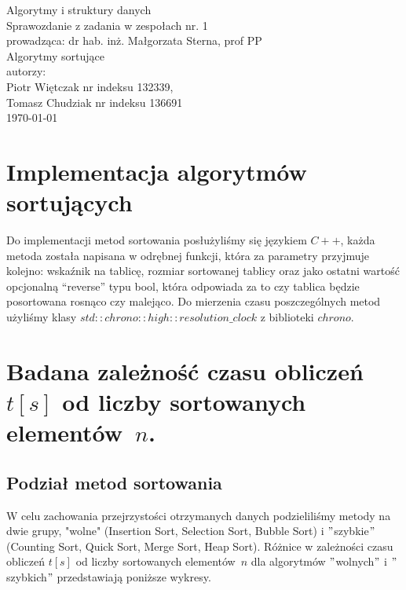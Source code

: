 \documentclass[polish,polish,a4paper]{article}
\begin{document}
	
\begin{spacing}{1.5}
		\begin{titlepage}
		\vspace*{\fill}
		\begin{center}
			{\Large Algorytmy i struktury danych \\[0.1cm]
				Sprawozdanie z zadania w zespołach nr. 1\\[0.1cm]
				prowadząca: dr hab. inż. Małgorzata Sterna, prof PP}\\[0.7cm]
			{\huge Algorytmy sortujące\\ [0.7cm]}
			{\large autorzy:\\[0.1cm]}
			{\Large Piotr Więtczak nr indeksu 132339,\\[0.1cm] Tomasz Chudziak nr indeksu 136691}\\[0.5cm]
			\today
		\end{center}
		\vspace*{\fill}
	\end{titlepage}
	
	\section{Implementacja algorytmów sortujących}
	Do implementacji metod sortowania posłużyliśmy się językiem $ C++ $, każda metoda została napisana  w odrębnej  funkcji, która za parametry przyjmuje kolejno: wskaźnik na tablicę, rozmiar sortowanej tablicy oraz jako ostatni wartość opcjonalną “reverse” typu bool, która odpowiada za to czy tablica będzie posortowana rosnąco czy malejąco. Do mierzenia czasu poszczególnych metod użyliśmy klasy $ std::chrono::high::resolution\_clock  $ z biblioteki $ chrono $.
	\section{Badana zależność czasu obliczeń $ t[s]$ od liczby sortowanych elementów~$ n $. }
	
	\subsection{Podział metod sortowania}
	W celu zachowania przejrzystości  otrzymanych danych podzieliliśmy metody na dwie grupy, "wolne" (Insertion Sort, Selection Sort, Bubble Sort) i $ " $szybkie$ " $ (Counting Sort, Quick Sort, Merge Sort, Heap Sort). Różnice w zależności czasu obliczeń $ t[s]$ od liczby sortowanych elementów~$ n $ dla algorytmów $ " $wolnych$ " $ i $ " $szybkich$ " $ przedstawiają poniższe wykresy.\\
	

\end{spacing}
\end{document}
